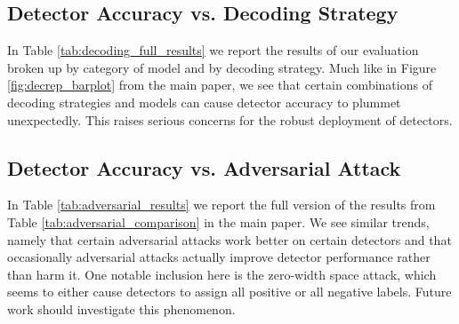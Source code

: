 \documentclass[11pt]{article}
\begin{document}
\subsection{Detector Accuracy vs. Decoding Strategy}
In Table \ref{tab:decoding_full_results} we report the results of our evaluation broken up by category of model and by decoding strategy. Much like in Figure \ref{fig:decrep_barplot} from the main paper, we see that certain combinations of decoding strategies and models can cause detector accuracy to plummet unexpectedly. This raises serious concerns for the robust deployment of detectors.

\subsection{Detector Accuracy vs. Adversarial Attack}
In Table \ref{tab:adversarial_results} we report the full version of the results from Table \ref{tab:adversarial_comparison} in the main paper. We see similar trends, namely that certain adversarial attacks work better on certain detectors and that occasionally adversarial attacks actually improve detector performance rather than harm it. One notable inclusion here is the zero-width space attack, which seems to either cause detectors to assign all positive or all negative labels. Future work should investigate this phenomenon.
\end{document}
